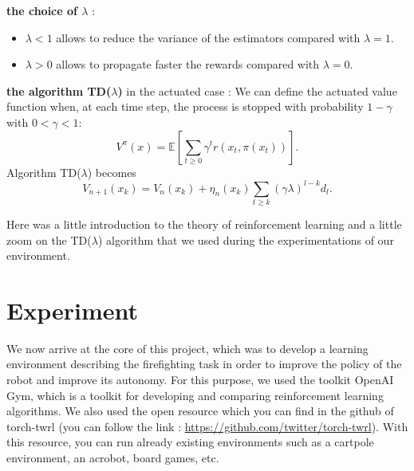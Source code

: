 \documentclass[conference]{IEEEtran}
\begin{document}




\textbf{the choice of $\lambda$} :
\begin{itemize}
 \item $\lambda < 1$ allows to reduce the variance of the estimators compared with $\lambda=1$.
 \item $\lambda > 0$ allows to propagate faster the rewards compared with $\lambda=0$.
\end{itemize}

\textbf{the algorithm TD($\lambda$)} in the actuated case :
We can define the actuated value function when, at each time step,
the process is stopped with probability $1 - \gamma$ with $0 < \gamma <1$:
\[ V^{\pi}(x) = \mathbb{E} [ \sum_{t \geqslant 0} \gamma^t r(x_t,\pi(x_t))  ]. \]
Algorithm TD($\lambda$) becomes
\begin{equation*}
V_{n+1}(x_k)=V_n(x_k)+\eta_n(x_k)\sum_{t \geqslant k}(\gamma \lambda)^{l-k}d_l.
\end{equation*}

Here was a little introduction to the theory of reinforcement learning and a little zoom on the TD($\lambda$) algorithm that we used during the experimentations of our environment.

\section{Experiment}

We now arrive at the core of this project, which was to develop a learning environment describing the firefighting task in order to improve the policy of the robot and improve its autonomy. For this purpose, we used the toolkit OpenAI Gym, which is a toolkit for developing and comparing reinforcement learning algorithms. We also used the open resource which you can find in the github of torch-twrl (you can follow the link : \url{https://github.com/twitter/torch-twrl}). With this resource, you can run already existing environments such as a cartpole environment, an acrobot, board games, etc.
\end{document}
